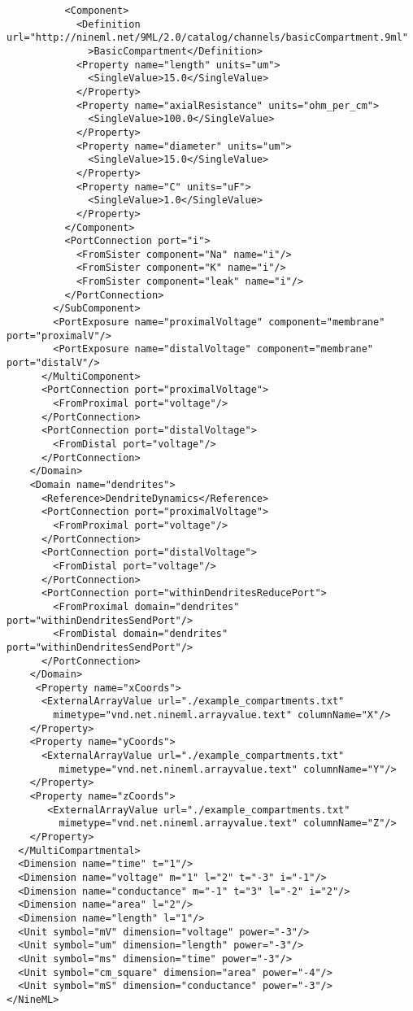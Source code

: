 \documentclass[draftspec]{ninemlspec}
\begin{document}
\begin{lstlisting}
          <Component>
            <Definition url="http://nineml.net/9ML/2.0/catalog/channels/basicCompartment.9ml"
              >BasicCompartment</Definition>
            <Property name="length" units="um">
              <SingleValue>15.0</SingleValue>
            </Property>
            <Property name="axialResistance" units="ohm_per_cm">
              <SingleValue>100.0</SingleValue>
            </Property>
            <Property name="diameter" units="um">
              <SingleValue>15.0</SingleValue>
            </Property>
            <Property name="C" units="uF">
              <SingleValue>1.0</SingleValue>
            </Property>
          </Component>
          <PortConnection port="i">
            <FromSister component="Na" name="i"/>
            <FromSister component="K" name="i"/>
            <FromSister component="leak" name="i"/>
          </PortConnection>
        </SubComponent>
        <PortExposure name="proximalVoltage" component="membrane" port="proximalV"/>
        <PortExposure name="distalVoltage" component="membrane" port="distalV"/>
      </MultiComponent>
      <PortConnection port="proximalVoltage">
        <FromProximal port="voltage"/>
      </PortConnection>
      <PortConnection port="distalVoltage">
        <FromDistal port="voltage"/>
      </PortConnection>
    </Domain>
    <Domain name="dendrites">
      <Reference>DendriteDynamics</Reference>
      <PortConnection port="proximalVoltage">
        <FromProximal port="voltage"/>
      </PortConnection>
      <PortConnection port="distalVoltage">
        <FromDistal port="voltage"/>
      </PortConnection>
      <PortConnection port="withinDendritesReducePort">
        <FromProximal domain="dendrites" port="withinDendritesSendPort"/>
        <FromDistal domain="dendrites" port="withinDendritesSendPort"/>
      </PortConnection>
    </Domain>
     <Property name="xCoords">
      <ExternalArrayValue url="./example_compartments.txt"
        mimetype="vnd.net.nineml.arrayvalue.text" columnName="X"/>
    </Property>
    <Property name="yCoords">
      <ExternalArrayValue url="./example_compartments.txt"
         mimetype="vnd.net.nineml.arrayvalue.text" columnName="Y"/>
    </Property>
    <Property name="zCoords">
       <ExternalArrayValue url="./example_compartments.txt"
         mimetype="vnd.net.nineml.arrayvalue.text" columnName="Z"/>
    </Property>
  </MultiCompartmental>
  <Dimension name="time" t="1"/>
  <Dimension name="voltage" m="1" l="2" t="-3" i="-1"/>
  <Dimension name="conductance" m="-1" t="3" l="-2" i="2"/>
  <Dimension name="area" l="2"/>
  <Dimension name="length" l="1"/>
  <Unit symbol="mV" dimension="voltage" power="-3"/>
  <Unit symbol="um" dimension="length" power="-3"/>
  <Unit symbol="ms" dimension="time" power="-3"/>
  <Unit symbol="cm_square" dimension="area" power="-4"/>
  <Unit symbol="mS" dimension="conductance" power="-3"/>
</NineML>
\end{lstlisting}
\end{document}
